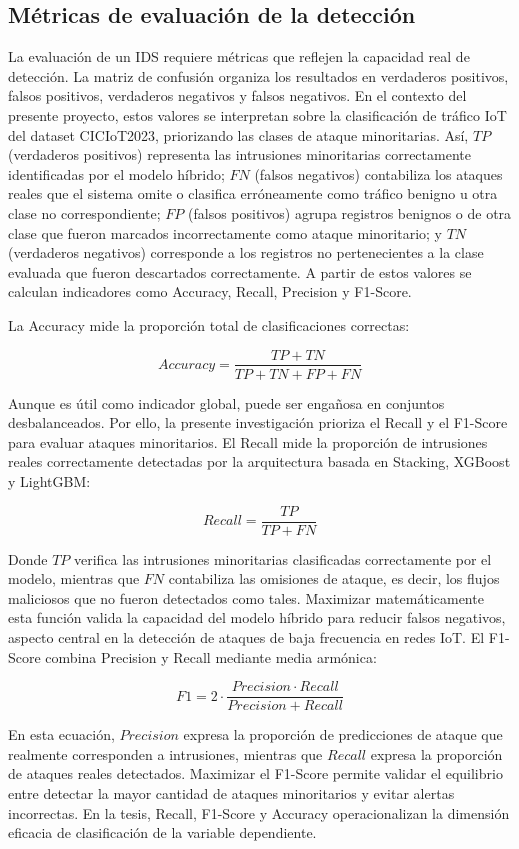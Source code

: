 \documentclass[12pt,a4paper]{article}
\begin{document}
\subsection{Métricas de evaluación de la detección}

La evaluación de un IDS requiere métricas que reflejen la capacidad real de detección. La matriz de confusión organiza los resultados en verdaderos positivos, falsos positivos, verdaderos negativos y falsos negativos. En el contexto del presente proyecto, estos valores se interpretan sobre la clasificación de tráfico IoT del dataset CICIoT2023, priorizando las clases de ataque minoritarias. Así, $TP$ (verdaderos positivos) representa las intrusiones minoritarias correctamente identificadas por el modelo híbrido; $FN$ (falsos negativos) contabiliza los ataques reales que el sistema omite o clasifica erróneamente como tráfico benigno u otra clase no correspondiente; $FP$ (falsos positivos) agrupa registros benignos o de otra clase que fueron marcados incorrectamente como ataque minoritario; y $TN$ (verdaderos negativos) corresponde a los registros no pertenecientes a la clase evaluada que fueron descartados correctamente. A partir de estos valores se calculan indicadores como Accuracy, Recall, Precision y F1-Score.

La Accuracy mide la proporción total de clasificaciones correctas:

\[
Accuracy = \frac{TP + TN}{TP + TN + FP + FN}
\]

Aunque es útil como indicador global, puede ser engañosa en conjuntos desbalanceados. Por ello, la presente investigación prioriza el Recall y el F1-Score para evaluar ataques minoritarios. El Recall mide la proporción de intrusiones reales correctamente detectadas por la arquitectura basada en Stacking, XGBoost y LightGBM:

\[
Recall = \frac{TP}{TP + FN}
\]

Donde $TP$ verifica las intrusiones minoritarias clasificadas correctamente por el modelo, mientras que $FN$ contabiliza las omisiones de ataque, es decir, los flujos maliciosos que no fueron detectados como tales. Maximizar matemáticamente esta función valida la capacidad del modelo híbrido para reducir falsos negativos, aspecto central en la detección de ataques de baja frecuencia en redes IoT. El F1-Score combina Precision y Recall mediante media armónica:

\[
F1 = 2 \cdot \frac{Precision \cdot Recall}{Precision + Recall}
\]

En esta ecuación, $Precision$ expresa la proporción de predicciones de ataque que realmente corresponden a intrusiones, mientras que $Recall$ expresa la proporción de ataques reales detectados. Maximizar el F1-Score permite validar el equilibrio entre detectar la mayor cantidad de ataques minoritarios y evitar alertas incorrectas. En la tesis, Recall, F1-Score y Accuracy operacionalizan la dimensión eficacia de clasificación de la variable dependiente.
\end{document}
